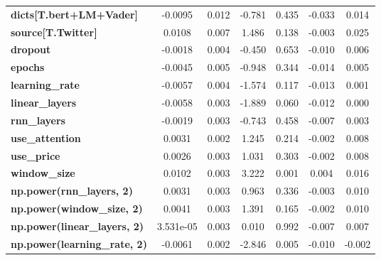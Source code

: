 \begin{center}
\begin{tabular}{lcccccc}
\textbf{dicts[T.bert+LM+Vader]}      &      -0.0095  &        0.012     &    -0.781  &         0.435        &       -0.033    &        0.014     \\
\textbf{source[T.Twitter]}           &       0.0108  &        0.007     &     1.486  &         0.138        &       -0.003    &        0.025     \\
\textbf{dropout}                     &      -0.0018  &        0.004     &    -0.450  &         0.653        &       -0.010    &        0.006     \\
\textbf{epochs}                      &      -0.0045  &        0.005     &    -0.948  &         0.344        &       -0.014    &        0.005     \\
\textbf{learning\_rate}              &      -0.0057  &        0.004     &    -1.574  &         0.117        &       -0.013    &        0.001     \\
\textbf{linear\_layers}              &      -0.0058  &        0.003     &    -1.889  &         0.060        &       -0.012    &        0.000     \\
\textbf{rnn\_layers}                 &      -0.0019  &        0.003     &    -0.743  &         0.458        &       -0.007    &        0.003     \\
\textbf{use\_attention}              &       0.0031  &        0.002     &     1.245  &         0.214        &       -0.002    &        0.008     \\
\textbf{use\_price}                  &       0.0026  &        0.003     &     1.031  &         0.303        &       -0.002    &        0.008     \\
\textbf{window\_size}                &       0.0102  &        0.003     &     3.222  &         0.001        &        0.004    &        0.016     \\
\textbf{np.power(rnn\_layers, 2)}    &       0.0031  &        0.003     &     0.963  &         0.336        &       -0.003    &        0.010     \\
\textbf{np.power(window\_size, 2)}   &       0.0041  &        0.003     &     1.391  &         0.165        &       -0.002    &        0.010     \\
\textbf{np.power(linear\_layers, 2)} &    3.531e-05  &        0.003     &     0.010  &         0.992        &       -0.007    &        0.007     \\
\textbf{np.power(learning\_rate, 2)} &      -0.0061  &        0.002     &    -2.846  &         0.005        &       -0.010    &       -0.002     \\

\end{tabular}
\end{center}
